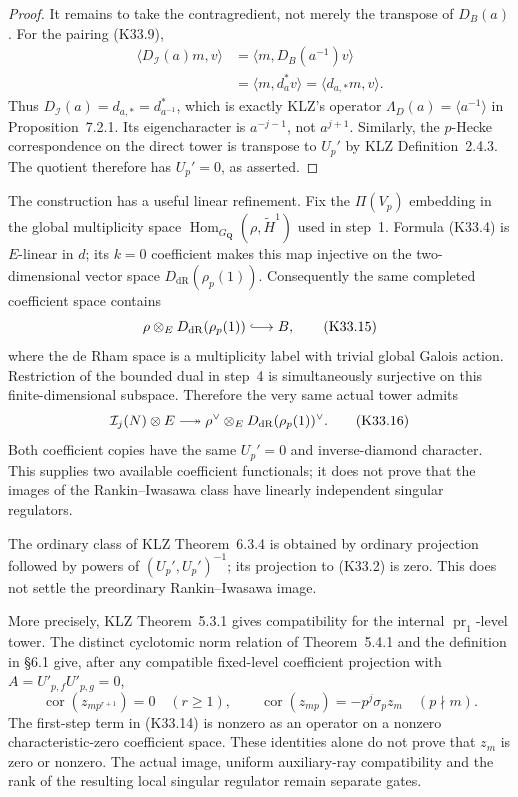 \begin{proof}
It remains to take the contragredient, not merely the
transpose of \(D_B(a)\).  For the pairing (K33.9),
\[
 \begin{split}
 \langle D_{\mathcal I}(a)m,v\rangle
 &=\langle m,D_B(a^{-1})v\rangle\\
 &=\langle m,d_a^*v\rangle
  =\langle d_{a,*}m,v\rangle.
 \end{split}
 \tag{K33.13}
\]
Thus \(D_{\mathcal I}(a)=d_{a,*}=d_{a^{-1}}^*\), which is
exactly KLZ's operator \(\Lambda_D(a)=\langle a^{-1}\rangle\)
in Proposition~7.2.1.  Its eigencharacter is
\(a^{-j-1}\), not \(a^{j+1}\).
Similarly, the \(p\)-Hecke correspondence on the direct
tower is transpose to \(U_p'\) by KLZ Definition~2.4.3.
The quotient therefore has \(U_p'=0\), as asserted.
\end{proof}


\begin{remark}
The construction has a useful linear refinement.  Fix the
\(\Pi(V_p)\) embedding in the global multiplicity space
\(\operatorname{Hom}_{G_{\mathbf Q}}(\rho,\widetilde H^1)\)
used in step~1.  Formula (K33.4) is \(E\)-linear in \(d\);
its \(k=0\) coefficient makes this map injective on the
two-dimensional vector space \(D_{\mathrm{dR}}(\rho_p(1))\).
Consequently the same completed coefficient space contains
\[
 \rho\otimes_E D_{\mathrm{dR}}(\rho_p(1))
 \lhook\joinrel\longrightarrow B,
 \tag{K33.15}
\]
where the de Rham space is a multiplicity label with trivial
global Galois action.  Restriction of the bounded dual in
step~4 is simultaneously surjective on this finite-dimensional
subspace.  Therefore the very same actual tower admits
\[
 \mathcal I_j(N)\otimes E
 \longtwoheadrightarrow
 \rho^\vee\otimes_E D_{\mathrm{dR}}(\rho_p(1))^\vee .
 \tag{K33.16}
\]
Both coefficient copies have the same \(U_p'=0\) and
inverse-diamond character.  This supplies two available
coefficient functionals; it does not prove that the images
of the Rankin--Iwasawa class have linearly independent
singular regulators.
\end{remark}
\begin{remark}
The ordinary class of KLZ Theorem~6.3.4 is obtained by
ordinary projection followed by powers of
\((U_p',U_p')^{-1}\); its projection to (K33.2) is zero.
This does not settle the preordinary Rankin--Iwasawa image.

More precisely, KLZ Theorem~5.3.1 gives compatibility for
the internal \(\operatorname{pr}_1\)-level tower.
The distinct cyclotomic norm relation of Theorem~5.4.1
and the definition in \S6.1 give, after any compatible
fixed-level coefficient projection with
\(A=U'_{p,f}U'_{p,g}=0\),
\[
 \operatorname{cor}(z_{mp^{r+1}})=0\quad(r\geq1),
 \qquad
 \operatorname{cor}(z_{mp})=-p^j\sigma_p z_m
 \quad(p\nmid m).
 \tag{K33.14}
\]
The first-step term in (K33.14) is nonzero as an operator
on a nonzero characteristic-zero coefficient space.
These identities alone do not prove that \(z_m\) is zero
or nonzero.  The actual image, uniform auxiliary-ray
compatibility and the rank of the resulting local singular
regulator remain separate gates.
\end{remark}

